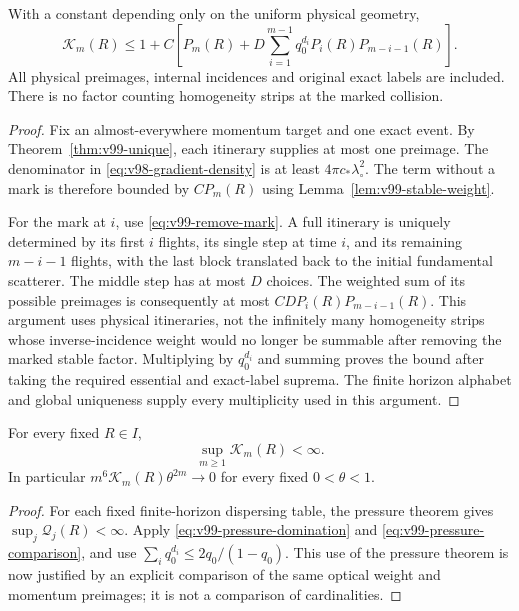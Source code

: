 \begin{theorem}
\label{thm:v99-pressure-comparison}
With a constant depending only on the uniform physical geometry,
\begin{equation}\label{eq:v99-pressure-comparison}
 \mathcal K_m(R)\le 1+C\left[ P_m(R)+D\sum_{i=1}^{m-1}q_0^{d_i}
                       P_i(R)P_{m-i-1}(R)\right].
\end{equation}
All physical preimages, internal incidences and original exact labels
are included. There is no factor counting homogeneity strips at the
marked collision.
\end{theorem}
\begin{proof}
Fix an almost-everywhere momentum target and one exact event. By
Theorem~\ref{thm:v99-unique}, each itinerary supplies at most one
preimage. The denominator in \eqref{eq:v98-gradient-density} is at
least $4\pi c_*\lambda_\circ^2$. The term without a mark is therefore
bounded by $CP_m(R)$ using Lemma~\ref{lem:v99-stable-weight}.

For the mark at $i$, use \eqref{eq:v99-remove-mark}. A full itinerary
is uniquely determined by its first $i$ flights, its single step at
time $i$, and its remaining $m-i-1$ flights, with the last block
translated back to the initial fundamental scatterer. The middle step
has at most $D$ choices. The weighted sum of its possible preimages
is consequently at most $CDP_i(R)P_{m-i-1}(R)$. This argument uses
physical itineraries, not the infinitely many homogeneity strips
whose inverse-incidence weight would no longer be summable after
removing the marked stable factor. Multiplying by $q_0^{d_i}$ and
summing proves the bound after taking the required essential and
exact-label suprema. The finite horizon alphabet and global
uniqueness supply every multiplicity used in this argument.
\end{proof}

\begin{corollary}
\label{cor:v99-fixed-radius}
For every fixed $R\in I$,
\begin{equation}\label{eq:v99-fixed-radius}
                    \sup_{m\ge1}\mathcal K_m(R)<\infty.
\end{equation}
In particular $m^6\mathcal K_m(R)\theta^{2m}\to0$ for every fixed
$0<\theta<1$.
\end{corollary}
\begin{proof}
For each fixed finite-horizon dispersing table, the pressure theorem
\cite[Lemma 3.8, proof]{BDPressure} gives
$\sup_j\mathcal Q_j(R)<\infty$. Apply
\eqref{eq:v99-pressure-domination} and
\eqref{eq:v99-pressure-comparison}, and use
$\sum_iq_0^{d_i}\le2q_0/(1-q_0)$. This use of the pressure theorem
is now justified by an explicit comparison of the same optical
weight and momentum preimages; it is not a comparison of cardinalities.
\end{proof}

